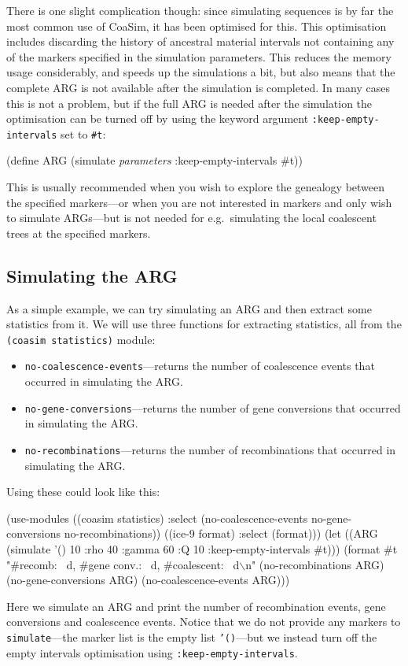 \documentclass{manual}
\begin{document}
There is one slight complication though: since simulating sequences is
by far the most common use of CoaSim, it has been optimised for this.
This optimisation includes discarding the history of ancestral
material intervals not containing any of the markers specified in the
simulation parameters.  This reduces the memory usage considerably,
and speeds up the simulations a bit, but also means that the complete
ARG is not available after the simulation is completed.  In many cases
this is not a problem, but if the full ARG is needed after the
simulation the optimisation can be turned off by using the keyword
argument \texttt{:keep-empty-intervals} set to \texttt{\#t}:

\begin{code}
(define ARG (simulate \emph{parameters} :keep-empty-intervals \#t))
\end{code}

This is usually recommended when you wish to explore the genealogy
between the specified markers---or when you are not interested in
markers and only wish to simulate ARGs---but is not needed for e.g.\
simulating the local coalescent trees at the specified markers.


\subsection{Simulating the ARG}
\label{sec:simulating-arg}

As a simple example, we can try simulating an ARG and then extract
some statistics from it.  We will use three functions for
extracting statistics, all from the \texttt{(coasim statistics)} module:
\begin{itemize}
\item \texttt{no-coalescence-events}---returns the number of
  coalescence events that occurred in simulating the ARG.
\item \texttt{no-gene-conversions}---returns the number of gene
  conversions that occurred in simulating the ARG.
\item \texttt{no-recombinations}---returns the number of
  recombinations that occurred in simulating the ARG.
\end{itemize}

Using these could look like this:
\begin{code}
(use-modules ((coasim statistics) :select (no-coalescence-events
                                           no-gene-conversions
                                           no-recombinations))
             ((ice-9 format) :select (format)))
(let ((ARG (simulate '() 10
                     :rho 40 :gamma 60 :Q 10
                     :keep-empty-intervals \#t)))
  (format #t "#recomb: ~d, #gene conv.: ~d, #coalescent: ~d\(\backslash\)n"
          (no-recombinations     ARG)
          (no-gene-conversions   ARG)
          (no-coalescence-events ARG)))  
\end{code}
Here we simulate an ARG and print the number of recombination events,
gene conversions and coalescence events.  Notice that we do not
provide any markers to \texttt{simulate}---the marker list is the
empty list \texttt{'()}---but we instead turn off the empty intervals
optimisation using \texttt{:keep-empty-intervals}.
\end{document}
